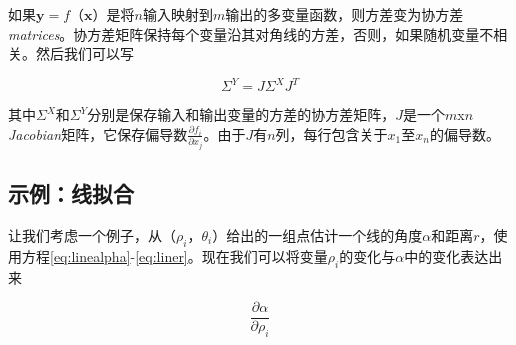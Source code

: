 如果$\mathbf{y}=f（\mathbf{x}）$是将$n$输入映射到$m$输出的多变量函数，则方差变为协方差\emph{matrices}。协方差矩阵保持每个变量沿其对角线的方差，否则，如果随机变量不相关。然后我们可以写

\begin{equation}
\Sigma^Y= J \Sigma^X J^T
\end{equation}


其中$\Sigma^X$和$\Sigma^Y$分别是保存输入和输出变量的方差的协方差矩阵，$J$是一个$m$x$n$\emph{Jacobian}矩阵，它保存偏导数$\frac{\partial f_i}{\partial x_j}$。由于$J$有$n$列，每行包含关于$x_1$至$x_n$的偏导数。

\subsection{示例：线拟合}
\label{sec:linefitting}


让我们考虑一个例子，从$（\rho_i，\theta_i）$给出的一组点估计一个线的角度$\alpha$和距离$r$，使用方程\ref{eq:linealpha}-\ref{eq:liner}。现在我们可以将变量$\rho_i$的变化与$\alpha$中的变化表达出来

\begin{equation}
\frac{\partial \alpha}{\partial \rho_i}
\end{equation}


